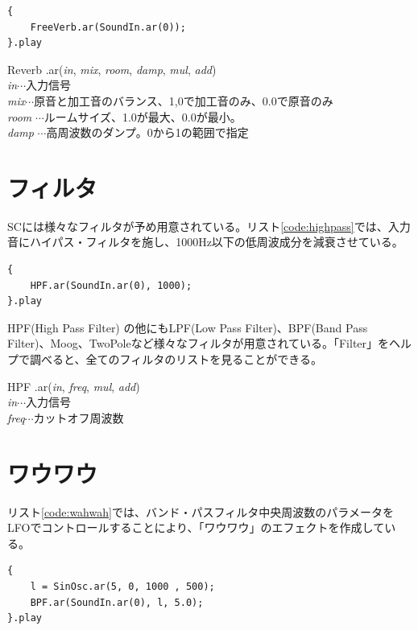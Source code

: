 \documentclass{jsarticle}
\begin{document}
\begin{lstlisting}[caption=リバーブ, label=code:reverb]
{
	FreeVerb.ar(SoundIn.ar(0));
}.play
\end{lstlisting}

\begin{itembox}[l]{Reverb}
{\footnotesize 
.ar({\it in}, {\it mix}, {\it room}, {\it damp}, {\it mul}, {\it add})\\

{\it in}$\cdots$入力信号\\
{\it mix}$\cdots$原音と加工音のバランス、1,0で加工音のみ、0.0で原音のみ\\
{\it room} $\cdots$ルームサイズ、1.0が最大、0.0が最小。\\
{\it damp} $\cdots$高周波数のダンプ。0から1の範囲で指定\\
}
\end{itembox}

\section{フィルタ}
SCには様々なフィルタが予め用意されている。リスト\ref{code:highpass}では、入力音にハイパス・フィルタを施し、1000Hz以下の低周波成分を減衰させている。

\begin{lstlisting}[caption=ハイパス・フィルタ, label=code:highpass]
{
	HPF.ar(SoundIn.ar(0), 1000);
}.play
\end{lstlisting}

HPF(High Pass Filter) の他にもLPF(Low Pass Filter)、BPF(Band Pass Filter)、Moog、TwoPoleなど様々なフィルタが用意されている。「Filter」をヘルプで調べると、全てのフィルタのリストを見ることができる。

\begin{itembox}[l]{HPF}
{\footnotesize 
.ar({\it in}, {\it freq}, {\it mul}, {\it add})\\

{\it in}$\cdots$入力信号\\
{\it freq}$\cdots$カットオフ周波数\\
}
\end{itembox}

\section{ワウワウ}
リスト\ref{code:wahwah}では、バンド・パスフィルタ中央周波数のパラメータをLFOでコントロールすることにより、「ワウワウ」のエフェクトを作成している。
\begin{lstlisting}[caption=ワウワウ, label=code:wahwah]
{
	l = SinOsc.ar(5, 0, 1000 , 500);
	BPF.ar(SoundIn.ar(0), l, 5.0);
}.play
\end{lstlisting}
\end{document}
